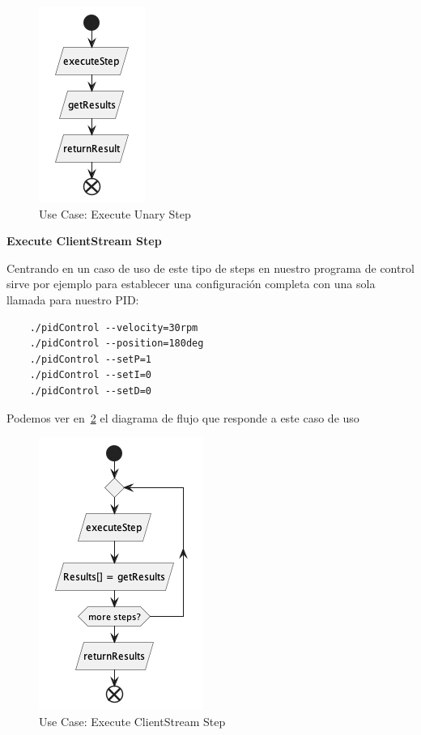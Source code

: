 \begin{figure}[H]
    \centering
    \includegraphics[height=0.2\textheight]{./part/Proyecto_ejecutivo/memoria_descriptiva/descripcionDelProyecto/client/uml/executeUnaryStep}
    \caption{Use Case: Execute Unary Step}\label{fig:Use Case-Execute Unary Step}
\end{figure}

\textbf{Execute ClientStream Step}

Centrando en un caso de uso de este tipo de steps en nuestro programa de control sirve por ejemplo para establecer una configuración completa con una sola llamada para nuestro PID:
\begin{verbatim}
    ./pidControl --velocity=30rpm
    ./pidControl --position=180deg
    ./pidControl --setP=1
    ./pidControl --setI=0
    ./pidControl --setD=0
\end{verbatim}

Podemos ver en~\cref{fig:Use Case-Execute ClientStream Step} el diagrama de flujo que responde a este caso de uso

\begin{figure}[H]
    \centering
    \includegraphics[height=0.2\textheight]{./part/Proyecto_ejecutivo/memoria_descriptiva/descripcionDelProyecto/client/uml/executeClientStreamStep}
    \caption{Use Case: Execute ClientStream Step}\label{fig:Use Case-Execute ClientStream Step}
\end{figure}

